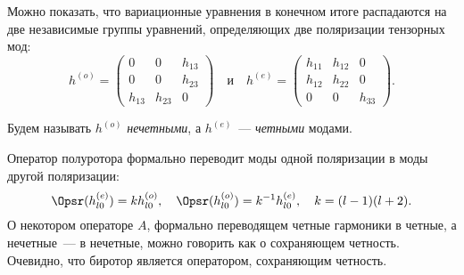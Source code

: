 \documentclass[\docroot/reports/draft/report.tex]{subfiles}
\begin{document}
    Можно показать, что вариационные уравнения в конечном итоге распадаются на две независимые группы уравнений, определяющих две поляризации тензорных мод:
    \begin{equation}
        h^{(o)} = \begin{pmatrix}0&0&h_{13}\\0&0&h_{23}\\h_{13}&h_{23}&0\end{pmatrix} \quad\text{и}\quad
        h^{(e)} = \begin{pmatrix}h_{11}&h_{12}&0\\h_{12}&h_{22}&0\\0&0&h_{33}\end{pmatrix} .
    \end{equation}

    Будем называть $h^{(o)}$ \textit{нечетными}, а $h^{(e)}$~--- \textit{четными} модами.

    Оператор полуротора формально переводит моды одной поляризации в моды другой поляризации:
    \begin{equation}\label{eq:sr-he-ho}
        \Opsr(h_{l0}^{(e)}) = k h_{l0}^{(o)}, \quad \Opsr(h_{l0}^{(o)}) = k^{-1} h_{l0}^{(e)}, \quad k = (l-1)(l+2) .
    \end{equation}
    О некотором операторе $A$, формально переводящем четные гармоники в четные, а нечетные~--- в нечетные, можно говорить как о сохраняющем четность. Очевидно, что биротор является оператором, сохраняющим четность.
\end{document}
